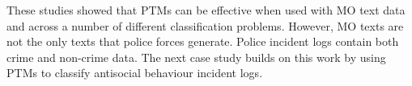 These studies showed that PTMs can be effective when used with MO text data and across a number of different classification problems. However, MO texts are not the only texts that police forces generate. Police incident logs contain both crime and non-crime data. The next case study builds on this work by using PTMs to classify antisocial behaviour incident logs. 






